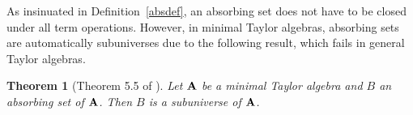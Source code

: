 \documentclass[11pt]{amsart}
\newcommand{\m}[1]{\mathbf{\uppercase{#1}}}
\newtheorem{thm}{Theorem}
\theoremstyle{definition}
\newtheorem{dfn}[thm]{Definition}
\theoremstyle{remark}
\theoremstyle{plain}
\begin{document}
As insinuated in Definition~\ref{absdef}, an absorbing set does not have to be closed under all term operations. However, in minimal Taylor algebras, absorbing sets are automatically subuniverses due to the following result, which fails in general Taylor algebras.

\begin{thm}[Theorem 5.5 of \cite{dreamteam}]\label{abssetsubuniv}
Let $\m a$ be a minimal Taylor algebra and $B$ an absorbing set of $\m a$. Then $B$ is a subuniverse of $\m a$.
\end{thm}



\end{document}
